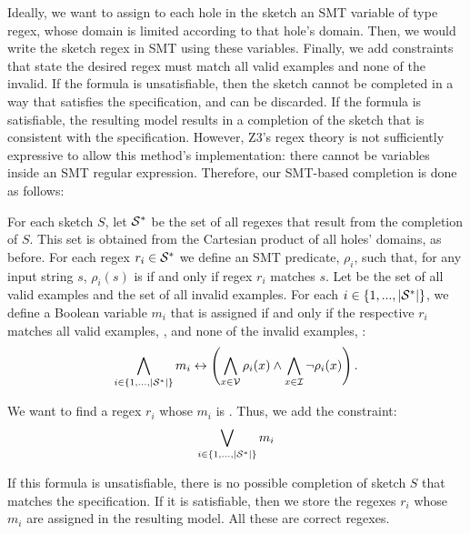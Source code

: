 Ideally, we want to assign to each hole in the sketch an SMT variable of type regex, whose domain is limited according to that hole's domain. Then, we would write the sketch regex in SMT using these variables. Finally, we add constraints that state the desired regex must match all valid examples and none of the invalid. If the formula is unsatisfiable, then the sketch cannot be completed in a way that satisfies the specification, and can be discarded. If the formula is satisfiable, the resulting model results in a completion of the sketch that is consistent with the specification.
However, Z3's regex theory is not sufficiently expressive to allow this method's implementation: there cannot be variables inside an SMT regular expression. Therefore, our SMT-based completion is done as follows:

For each sketch \(S\), let \({\mathcal{S}}^*\) be the set of all regexes that result from the completion of \(S\). This set is obtained from the Cartesian product of all holes' domains, as before. For each regex \(r_i \in {\ensuremath{\mathcal{S}}}^*\) we define an SMT predicate, \(\rho_i\), such that, for any input string \(s\), \(\rho_i(s)\) is \true if and only if regex \(r_i\) matches \(s\). Let  be the set of all valid examples and  the set of all invalid examples. For each \(i \in \{1, ..., |{\mathcal{S}}^*|\}\), we define a Boolean variable \(m_i\) that is assigned \true if and only if the respective \(r_i\) matches all valid examples, , and none of the invalid examples, :
\begin{equation}
    \bigwedge_{i \in \{1, ..., |{\mathcal{S}}^*|\}} m_i \leftrightarrow
    \left( \bigwedge_{x \in {\ensuremath{\mathcal{V}}}} \rho_i(x) \land \bigwedge_{x \in {\ensuremath{\mathcal{I}}}} \neg \rho_i(x) \right).
\end{equation}

\noindent
We want to find a regex \(r_i\) whose \(m_i\) is \true. Thus, we add the constraint:
\begin{equation}
    \bigvee_{i \in \{1, ..., |{\mathcal{S}}^*|\}} m_i
\end{equation}

If this formula is unsatisfiable, there is no possible completion of sketch \(S\) that matches the specification. If it is satisfiable, then we store the regexes \(r_i\) whose \(m_i\) are assigned \true in the resulting model. All these are correct regexes.


